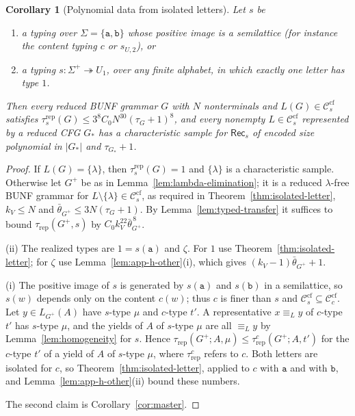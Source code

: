 \documentclass[11pt]{article}
\numberwithin{equation}{section}
\theoremstyle{plain}
\newtheorem{corollary}[theorem]{Corollary}
\theoremstyle{definition}
\theoremstyle{remark}
\theoremstyle{plain}
\newcommand{\cf}{\mathrm{cf}}
\newcommand{\Ccf}[1]{\mathcal C_{#1}^{\cf}}
\newcommand{\Rec}{\mathsf{Rec}}
\newcommand{\trep}{\tau_{\mathrm{rep}}}
\begin{document}
\begin{corollary}[Polynomial data from isolated letters]
\label{cor:isolated-data}
Let $s$ be
\begin{enumerate}[label=\textup{(\roman*)},leftmargin=*]
\item a typing over $\Sigma=\{\mathtt a,\mathtt b\}$ whose positive image is a
semilattice \textup(for instance the content typing $c$ or $s_{U,2}$\textup), or
\item a typing $s:\Sigma^+\twoheadrightarrow U_1$, over any finite alphabet, in
which exactly one letter has type $1$.
\end{enumerate}
Then every reduced BUNF grammar $G$ with $N$ nonterminals and
$L(G)\in\Ccf{s}$ satisfies $\tau^{\mathrm{rep}}_s(G)\le3^8C_0N^{30}(\tau_G+1)^8$,
and every nonempty $L\in\Ccf{s}$ represented by a reduced CFG $G_*$ has a
characteristic sample for $\Rec_s$ of encoded size polynomial in $|G_*|$ and
$\tau_{G_*}+1$.
\end{corollary}

\begin{proof}
If $L(G)=\{\lambda\}$, then $\tau^{\mathrm{rep}}_s(G)=1$ and $\{\lambda\}$ is a
characteristic sample.  Otherwise let $G^+$ be as in Lemma~\ref{lem:lambda-elimination}; it is a reduced
$\lambda$-free BUNF grammar for $L\setminus\{\lambda\}\in\Ccf{s}$, as required in
Theorem~\ref{thm:isolated-letter}, $k_V\le N$ and
$\bar\theta_{G^+}\le3N(\tau_G+1)$.  By Lemma~\ref{lem:typed-transfer} it suffices
to bound $\trep(G^+,s)$ by $C_0k_V^{22}\bar\theta_{G^+}^{\,8}$.

(ii) The realized types are $1=s(\mathtt a)$ and $\zeta$.  For $1$ use
Theorem~\ref{thm:isolated-letter}; for $\zeta$ use
Lemma~\ref{lem:app-h-other}(i), which gives $(k_V-1)\bar\theta_{G^+}+1$.

(i) The positive image of $s$ is generated by $s(\mathtt a)$ and $s(\mathtt b)$ in a
semilattice, so $s(w)$ depends only on the content $c(w)$; thus $c$ is finer
than $s$ and $\Ccf{s}\subseteq\Ccf{c}$.  Let $y\in L_{G^+}(A)$ have $s$-type $\mu$
and $c$-type $t'$.  A representative $x\equiv_L y$ of $c$-type $t'$ has
$s$-type $\mu$, and the yields of $A$ of $s$-type $\mu$ are all $\equiv_L y$ by
Lemma~\ref{lem:homogeneity} for $s$.  Hence $\trep(G^+;A,\mu)\le\tau^{c}_{\mathrm{rep}}(G^+;A,t')$ for the
$c$-type $t'$ of a yield of $A$ of $s$-type $\mu$, where $\tau^{c}_{\mathrm{rep}}$ refers to $c$.
Both letters are isolated for $c$, so Theorem~\ref{thm:isolated-letter},
applied to $c$ with $\mathtt a$ and with $\mathtt b$, and
Lemma~\ref{lem:app-h-other}(ii) bound these numbers.

The second claim is Corollary~\ref{cor:master}.
\end{proof}
\end{document}

